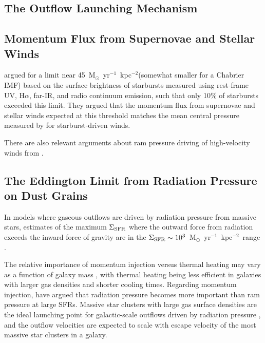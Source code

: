 \documentclass[apj]{emulateapj}
\newcommand{\units}{M$_{\odot}$~yr$^{-1}$~kpc$^{-2}$}
\newcommand{\sigmasfr}{\Sigma_{\textnormal{\scriptsize{SFR}}}}
\begin{document}
\subsection{The Outflow Launching Mechanism}

\subsection{Momentum Flux from Supernovae and Stellar Winds}

\citet{meu97} argued for a limit near 45~\units (somewhat smaller for
a Chabrier IMF) based on the surface brightness of starbursts measured
using rest-frame UV, H$\alpha$, far-IR, and radio continuum emission,
such that only 10\% of starbursts exceeded this limit.  They argued
that the momentum flux from supernovae and stellar winds expected at
this threshold matches the mean central pressure measured by
\citet{hec90} for starburst-driven winds.

There are also relevant arguments about ram pressure driving of
high-velocity winds from \citet{hec11}.


\subsection{The Eddington Limit from Radiation Pressure on Dust Grains}

In models where gaseous outflows are driven by radiation pressure from
massive stars, estimates of the maximum $\sigmasfr$ where the outward
force from radiation exceeds the inward force of gravity are in the
$\sigmasfr\sim10^3$~\units\ range \citep[e.g.,][]{tho05,hop10}.


The relative importance of momentum injection versus thermal heating
may vary as a function of galaxy mass \citep[e.g.,][]{hop12}, with
thermal heating being less efficient in galaxies with larger gas
densities and shorter cooling times.  Regarding momentum injection,
\citet{sha11} have argued that radiation pressure becomes more
important than ram pressure at large SFRs.  Massive star clusters with
large gas surface densities are the ideal launching point for
galactic-scale outflows driven by radiation pressure
\citep[e.g.,][]{mur11}, and the outflow velocities are expected to
scale with escape velocity of the most massive star clusters in a
galaxy.
\end{document}
